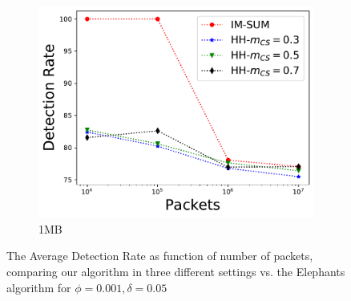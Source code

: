 \begin{figure}
\begin{subfigure}[t]{0.32\textwidth}
    \includegraphics[width=\linewidth]{HH/figures/DR_per_pkts_m=1.0.pdf}
    \caption{1MB}
    \label{fig:fig2_f}
\end{subfigure}

\caption{The Average Detection Rate as function of number of packets, comparing our algorithm in three different settings vs. the Elephants algorithm for $\phi=0.001,\delta=0.05$}
\label{figure2}
\end{figure}
